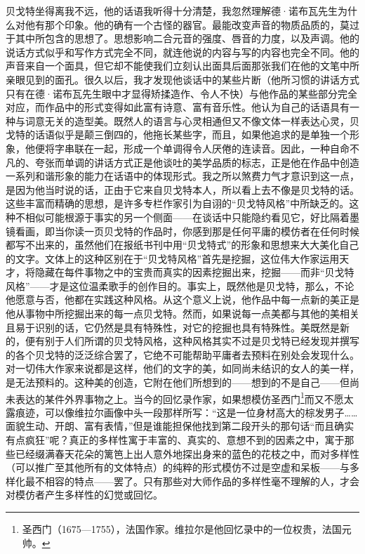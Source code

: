 \par 贝戈特坐得离我不远，他的话语我听得十分清楚，我忽然理解德·诺布瓦先生为什么对他有那个印象。他的确有一个古怪的器官。最能改变声音的物质品质的，莫过于其中所包含的思想了。思想影响二合元音的强度、唇音的力度，以及声调。他的说话方式似乎和写作方式完全不同，就连他说的内容与写的内容也完全不同。他的声音来自一个面具，但它却不能使我们立刻认出面具后面那张我们在他的文笔中所亲眼见到的面孔。很久以后，我才发现他谈话中的某些片断（他所习惯的讲话方式只有在德·诺布瓦先生眼中才显得矫揉造作、令人不快）与他作品的某些部分完全对应，而作品中的形式变得如此富有诗意、富有音乐性。他认为自己的话语具有一种与词意无关的造型美。既然人的语言与心灵相通但又不像文体一样表达心灵，贝戈特的话语似乎是颠三倒四的，他拖长某些字，而且，如果他追求的是单独一个形象，他便将字串联在一起，形成一个单调得令人厌倦的连读音。因此，一种自命不凡的、夸张而单调的讲话方式正是他谈吐的美学品质的标志，正是他在作品中创造一系列和谐形象的能力在话语中的体现形式。我之所以煞费力气才意识到这一点，是因为他当时说的话，正由于它来自贝戈特本人，所以看上去不像是贝戈特的话。这些丰富而精确的思想，是许多专栏作家引为自诩的“贝戈特风格”中所缺乏的。这种不相似可能根源于事实的另一个侧面——在谈话中只能隐约看见它，好比隔着墨镜看画，即当你读一页贝戈特的作品时，你感到那是任何平庸的模仿者在任何时候都写不出来的，虽然他们在报纸书刊中用“贝戈特式”的形象和思想来大大美化自己的文字。文体上的这种区别在于“贝戈特风格”首先是挖掘，这位伟大作家运用天才，将隐藏在每件事物之中的宝贵而真实的因素挖掘出来，挖掘——而非“贝戈特风格”——才是这位温柔歌手的创作目的。事实上，既然他是贝戈特，那么，不论他愿意与否，他都在实践这种风格。从这个意义上说，他作品中每一点新的美正是他从事物中所挖掘出来的每一点贝戈特。然而，如果说每一点美都与其他的美相关且易于识别的话，它仍然是具有特殊性，对它的挖掘也具有特殊性。美既然是新的，便有别于人们所谓的贝戈特风格，这种风格其实不过是贝戈特已经发现并撰写的各个贝戈特的泛泛综合罢了，它绝不可能帮助平庸者去预料在别处会发现什么。对一切伟大作家来说都是这样，他们的文字的美，如同尚未结识的女人的美一样，是无法预料的。这种美的创造，它附在他们所想到的——想到的不是自己——但尚未表达的某件外界事物之上。当今的回忆录作家，如果想模仿圣西门\footnote{圣西门（1675—1755），法国作家。维拉尔是他回忆录中的一位权贵，法国元帅。}而又不愿太露痕迹，可以像维拉尔画像中头一段那样所写：“这是一位身材高大的棕发男子……面貌生动、开朗、富有表情，”但是谁能担保他找到第二段开头的那句话“而且确实有点疯狂”呢？真正的多样性寓于丰富的、真实的、意想不到的因素之中，寓于那些已经缀满春天花朵的篱笆上出人意外地探出身来的蓝色的花枝之中，而对多样性（可以推广至其他所有的文体特点）的纯粹的形式模仿不过是空虚和呆板——与多样化最不相容的特点——罢了。只有那些对大师作品的多样性毫不理解的人，才会对模仿者产生多样性的幻觉或回忆。


